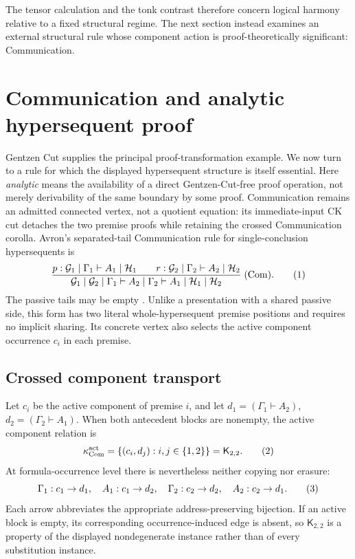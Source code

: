 \documentclass[10pt,a4paper]{article}
\theoremstyle{plain}
\theoremstyle{definition}
\theoremstyle{remark}
\newcommand{\ms}{\mathrel{\vdash}}
\newcommand{\eqtag}{\refstepcounter{equation}\tag{\theequation}}
\begin{document}
The tensor calculation and the tonk contrast therefore concern logical
harmony relative to a fixed structural regime.  The next section instead
examines an external structural rule whose component action is
proof-theoretically significant: Communication.

\section{Communication and analytic hypersequent proof}
\label{sec:communication}

Gentzen Cut supplies the principal proof-transformation example.  We now
turn to a rule for which the displayed hypersequent structure is itself
essential.  Here \emph{analytic} means the availability of a direct
Gentzen-Cut-free proof operation, not merely derivability of the same
boundary by some proof.  Communication remains an admitted connected
vertex, not a quotient equation: its immediate-input CK cut detaches
the two premise proofs while retaining the crossed Communication corolla.
Avron's separated-tail Communication rule for
single-conclusion hypersequents is
\[
\frac{
 p:\mathcal G_1\mid\Gamma_1\ms A_1\mid\mathcal H_1
 \qquad
 r:\mathcal G_2\mid\Gamma_2\ms A_2\mid\mathcal H_2
}{
 \mathcal G_1\mid\mathcal G_2
 \mid\Gamma_1\ms A_2
 \mid\Gamma_2\ms A_1
 \mid\mathcal H_1\mid\mathcal H_2
}\;(\mathrm{Com}).
\eqtag\label{eq:communication-separated}
\]
The passive tails may be empty
\cite{avron1991,avron1996hypersequents}.  Unlike a presentation with a
shared passive side, this form has two literal whole-hypersequent premise
positions and requires no implicit sharing.  Its concrete vertex also
selects the active component occurrence \(c_i\) in each premise.

\subsection{Crossed component transport}

Let \(c_i\) be the active component of premise \(i\), and let
\(d_1=(\Gamma_1\ms A_2)\), \(d_2=(\Gamma_2\ms A_1)\).
When both antecedent blocks are nonempty, the active component relation is
\[
 \kappa_{\mathrm{Com}}^{\mathrm{act}}
   =\{(c_i,d_j):i,j\in\{1,2\}\}
   =\mathsf K_{2,2}.
\eqtag\label{eq:communication-k22}
\]
At formula-occurrence level there is nevertheless neither copying nor
erasure:
\[
 \Gamma_1:c_1\to d_1,\quad A_1:c_1\to d_2,\quad
 \Gamma_2:c_2\to d_2,\quad A_2:c_2\to d_1 .
\eqtag\label{eq:communication-occurrences}
\]
Each arrow abbreviates the appropriate address-preserving bijection.
If an active block is empty, its corresponding occurrence-induced edge is
absent, so \(\mathsf K_{2,2}\) is a property of the displayed nondegenerate
instance rather than of every substitution instance.
\end{document}
